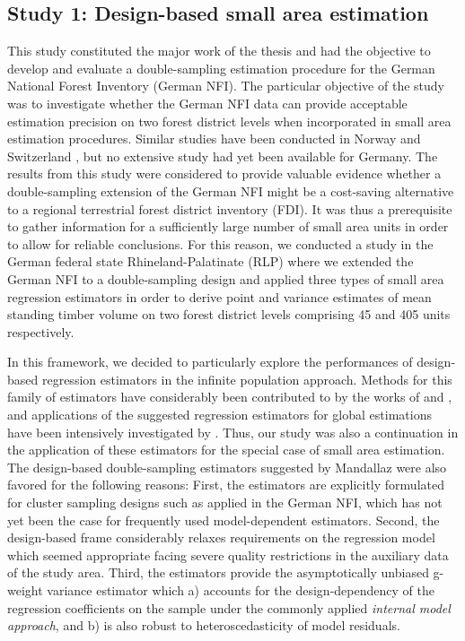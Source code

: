 \subsection{Study 1: Design-based small area estimation}
\label{sec:study1}


This study constituted the major work of the thesis and had the objective to develop and evaluate a double-sampling estimation procedure for the German National Forest Inventory (German NFI). The particular objective of the study was to investigate whether the German NFI data can provide acceptable estimation precision on two forest district levels when incorporated in small area estimation procedures. Similar studies have been conducted in Norway \citep{breidenbach2012} and Switzerland \citep{magnussen2014a, steinmann2013}, but no extensive study had yet been available for Germany. The results from this study were considered to provide valuable evidence whether a double-sampling extension of the German NFI might be a cost-saving alternative to a regional terrestrial forest district inventory (FDI). It was thus a prerequisite to gather information for a sufficiently large number of small area units in order to allow for reliable conclusions. For this reason, we conducted a study in the German federal state Rhineland-Palatinate (RLP) where we extended the German NFI to a double-sampling design and applied three types of small area regression estimators in order to derive point and variance estimates of mean standing timber volume on two forest district levels comprising 45 and 405 units respectively.\par

In this framework, we decided to particularly explore the performances of design-based regression estimators in the infinite population approach. Methods for this family of estimators have considerably been contributed to by the works of \citet{mandallaz2008, mandallaz2013a, mandallaz2013c} and \citet{mandallaz2013b}, and applications of the suggested regression estimators for global estimations have been intensively investigated by \citet{massey2015_thesis}. Thus, our study was also a continuation in the application of these estimators for the special case of small area estimation. The design-based double-sampling estimators suggested by Mandallaz were also favored for the following reasons: First, the estimators are explicitly formulated for cluster sampling designs such as applied in the German NFI, which has not yet been the case for frequently used model-dependent estimators. Second, the design-based frame considerably relaxes requirements on the regression model which seemed appropriate facing severe quality restrictions in the auxiliary data of the study area. Third, the estimators provide the asymptotically unbiased g-weight variance estimator which a) accounts for the design-dependency of the regression coefficients on the sample under the commonly applied \textit{internal model approach}, and b) is also robust to heteroscedasticity of model residuals.\par

